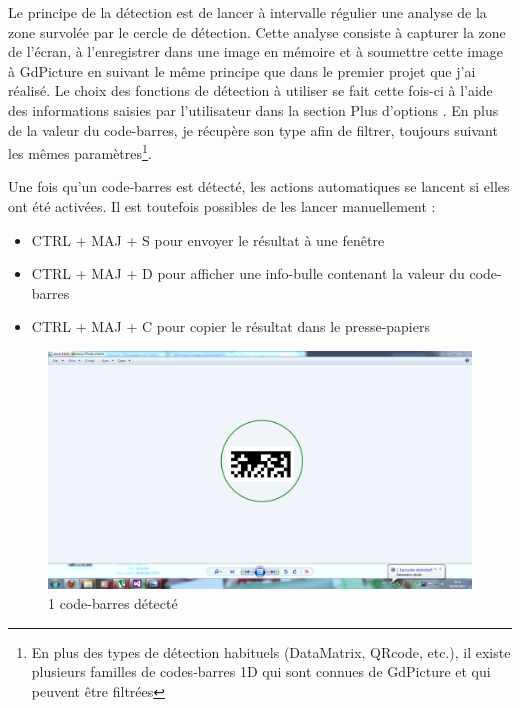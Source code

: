 Le principe de la détection est de lancer à intervalle régulier une analyse de la zone survolée par le cercle de détection. Cette analyse consiste à capturer la zone de l'écran, à l'enregistrer dans une image en mémoire et à soumettre cette image à GdPicture en suivant le même principe que dans le premier projet que j'ai réalisé. Le choix des fonctions de détection à utiliser se fait cette fois-ci à l'aide des informations saisies par l'utilisateur dans la section \og Plus d'options \fg{}. En plus de la valeur du code-barres, je récupère son type afin de filtrer, toujours suivant les mêmes paramètres\footnote{En plus des types de détection habituels (DataMatrix, QRcode, etc.), il existe plusieurs familles de codes-barres 1D qui sont connues de GdPicture et qui peuvent être filtrées}.

Une fois qu'un code-barres est détecté, les actions automatiques se lancent si elles ont été activées. Il est toutefois possibles de les lancer manuellement :
\begin{itemize}
\item CTRL + MAJ + S pour envoyer le résultat à une fenêtre
\item CTRL + MAJ + D pour afficher une info-bulle contenant la valeur du code-barres
\item CTRL + MAJ + C pour copier le résultat dans le presse-papiers
\end{itemize}

\begin{figure}
\begin{center}
\includegraphics[scale=0.3]{images/detected.png}
\end{center}
\caption{1 code-barres détecté}
\label{detectedBarcode}
\end{figure}

\clearpage

